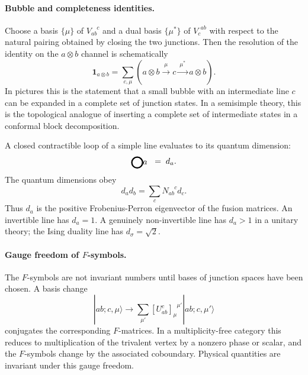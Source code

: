 \documentclass[11pt]{article}
\newcommand{\id}{\mathbf{1}}
\begin{document}
\paragraph{Bubble and completeness identities.}
Choose a basis $\{\mu\}$ of $V_{ab}^{\phantom{ab}c}$ and a dual basis $\{\mu^*\}$ of $V_{c}^{\phantom{c}ab}$ with respect to the natural pairing obtained by closing the two junctions.  Then the resolution of the identity on the $a\otimes b$ channel is schematically
\begin{equation}
  \id_{a\otimes b}
  =
  \sum_{c,\mu}
  \left(
  a\otimes b\xrightarrow{\ \mu\ } c
  \xrightarrow{\ \mu^*\ } a\otimes b
  \right) .
  \label{eq:junctioncompleteness}
\end{equation}
In pictures this is the statement that a small bubble with an intermediate line $c$ can be expanded in a complete set of junction states.  In a semisimple theory, this is the topological analogue of inserting a complete set of intermediate states in a conformal block decomposition.

A closed contractible loop of a simple line evaluates to its quantum dimension:
\begin{equation}
  \begin{tikzpicture}[scale=0.35,baseline={(0,-0.05)}]
    \draw[ultra thick] (0,0) circle (0.65);
    \node at (0.95,0) {$a$};
  \end{tikzpicture}
  \;=\; d_a .
  \label{eq:closedloopqdim}
\end{equation}
The quantum dimensions obey
\begin{equation}
  d_a d_b=\sum_c N_{ab}^{\phantom{ab}c}d_c .
  \label{eq:qdimfusion}
\end{equation}
Thus $d_a$ is the positive Frobenius-Perron eigenvector of the fusion matrices.  An invertible line has $d_a=1$.  A genuinely non-invertible line has $d_a>1$ in a unitary theory; the Ising duality line has $d_\sigma=\sqrt2$.

\paragraph{Gauge freedom of $F$-symbols.}
The $F$-symbols are not invariant numbers until bases of junction spaces have been chosen.  A basis change
\begin{equation}
  |ab;c,\mu\rangle
  \longrightarrow
  \sum_{\mu'}
  \left[U_{ab}^{c}\right]_{\mu}^{\phantom{\mu}\mu'}
  |ab;c,\mu'\rangle
\end{equation}
conjugates the corresponding $F$-matrices.  In a multiplicity-free category this reduces to multiplication of the trivalent vertex by a nonzero phase or scalar, and the $F$-symbols change by the associated coboundary.  Physical quantities are invariant under this gauge freedom.
\end{document}
